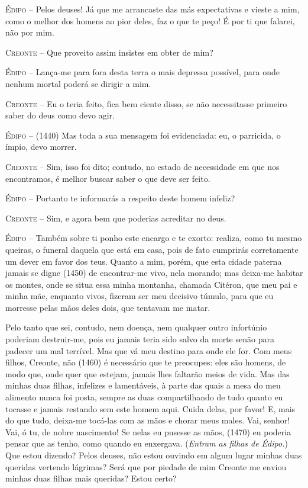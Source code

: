 \textsc{Édipo} --   Pelos deuses! Já que me arrancaste das más expectativas e vieste a mim,
como o melhor dos homens ao pior deles, faz o que te peço! É por ti que
falarei, não por mim.

\textsc{Creonte} --   Que proveito assim insistes em obter de mim?

\textsc{Édipo} --   Lança-me para fora desta terra o mais depressa possível, para onde
nenhum mortal poderá se dirigir a mim.

\textsc{Creonte} --   Eu o teria feito, fica bem ciente disso, se não necessitasse primeiro
saber do deus como devo agir.

\textsc{Édipo} --   (1440) Mas toda a sua mensagem foi evidenciada: eu, o parricida, o
ímpio, devo morrer.

\textsc{Creonte} --   Sim, isso foi dito; contudo, no estado de necessidade em que nos
encontramos, é melhor buscar saber o que deve ser feito.

\textsc{Édipo} --   Portanto te informarás a respeito deste homem infeliz?

\textsc{Creonte} --   Sim, e agora bem que poderias acreditar no deus.

\textsc{Édipo} --   Também sobre ti ponho este encargo e te exorto: realiza, como tu mesmo
queiras, o funeral daquela que está em casa, pois de fato cumprirás
corretamente um dever em favor dos teus. Quanto a mim, porém, que esta
cidade paterna jamais se digne (1450) de encontrar-me vivo, nela
morando; mas deixa-me habitar os montes, onde se situa essa minha
montanha, chamada Citéron, que meu pai e minha mãe, enquanto vivos,
fizeram ser meu decisivo túmulo, para que eu morresse pelas mãos deles
dois, que tentavam me matar.

Pelo tanto que sei, contudo, nem doença, nem qualquer outro infortúnio
poderiam destruir-me, pois eu jamais teria sido salvo da morte senão
para padecer um mal terrível. Mas que vá meu destino para onde ele for.
Com meus filhos, Creonte, não (1460) é necessário que te preocupes: eles
são homens, de modo que, onde quer que estejam, jamais lhes faltarão
meios de vida. Mas das minhas duas filhas, infelizes e lamentáveis, à
parte das quais a mesa do meu alimento nunca foi posta, sempre as duas
compartilhando de tudo quanto eu tocasse e jamais restando sem este
homem aqui. Cuida delas, por favor! E, mais do que tudo, deixa-me
tocá-las com as mãos e chorar meus males. Vai, senhor! Vai, ó tu, de
nobre nascimento! Se nelas eu pusesse as mãos, (1470) eu poderia pensar
que as tenho, como quando eu enxergava. (\emph{Entram as filhas de
Édipo.}) Que estou dizendo? Pelos deuses, não estou ouvindo em algum
lugar minhas duas queridas vertendo lágrimas? Será que por piedade de
mim Creonte me enviou minhas duas filhas mais queridas? Estou certo?

